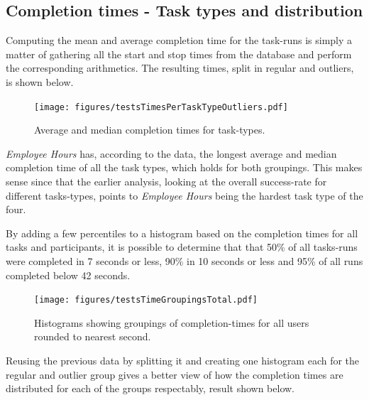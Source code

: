 \documentclass[nofilelist,dvipsnames]{cslthse-msc}
\begin{document}
{%
%
      \subsection{Completion times - Task types and distribution}

        Computing the mean and average completion time for the task-runs is
        simply a matter of gathering all the start and stop times from the
        database and perform the corresponding arithmetics. The resulting times,
        split in regular and outliers, is shown below.

        \begin{figure}[h!]
          \centering
          \texttt{[image: figures/testsTimesPerTaskTypeOutliers.pdf]}
          \vspace{-0.3cm}
          \caption{Average and median completion times for task-types. }
          \label{label_testsTimesPerTaskTypeOutliers}
        \end{figure}


        \textit{Employee Hours} has, according to the data, the longest average
        and median completion time of all the task types, which holds for both
        groupings. This makes sense since that the earlier analysis, looking at
        the overall success-rate for different tasks-types, points to
        \textit{Employee Hours} being the hardest task type of the four.

        By adding a few percentiles to a histogram based on the completion times for all
        tasks and participants, it is possible to determine that that 50\% of
        all tasks-runs were completed in 7 seconds or less, 90\% in 10 seconds
        or less and 95\% of all runs completed below 42 seconds.

        \begin{figure}[h!]
          \centering
          \texttt{[image: figures/testsTimeGroupingsTotal.pdf]}
          \caption{
            Histograms showing groupings of completion-times for all users
            rounded to nearest second.
          }
        \end{figure}

        Reusing the previous data by splitting it and creating one histogram
        each for the regular and outlier group gives a better view of how the
        completion times are distributed for each of the groups respectably,
        result shown below.

}
\end{document}
